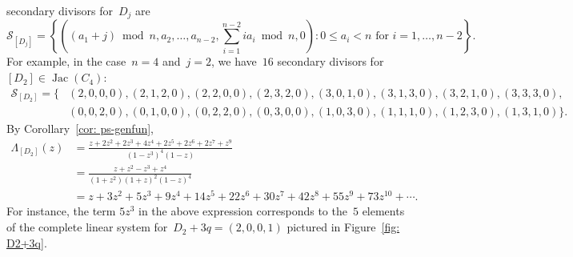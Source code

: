 \documentclass{amsart}
\DeclareMathOperator{\Jac}{Jac}
\newcommand{\secondary}{\mathcal{S}}
\begin{document}
secondary divisors for~$D_j$ are
\[
  \secondary_{[D_j]}=
  \textstyle
  \left\{ \left((a_1+j)\bmod n,a_2,\dots,a_{n-2},\sum_{i=1}^{n-2}ia_i\bmod n,0\right):0\leq
  a_i<n\text{ for~$i=1,\dots,n-2$} \right\}.
\]
For example, in the case~$n=4$ and~$j=2$, we have~$16$ secondary divisors
for~$[D_2]\in\Jac(C_4)$:
\begin{align*}
  \secondary_{[D_2]}= \{ &
    (2, 0, 0, 0), (2, 1, 2, 0), (2, 2, 0, 0), (2, 3, 2, 0), (3, 0, 1, 0), (3, 1, 3, 0),
    (3, 2, 1, 0), (3, 3, 3, 0),
    \\[8pt]
    & (0, 0, 2, 0), (0, 1, 0, 0), (0, 2, 2, 0), (0, 3, 0, 0), (1, 0, 3, 0), (1, 1, 1, 0),
    (1, 2, 3, 0),
  (1, 3, 1, 0) \}.
\end{align*}
By Corollary~\ref{cor: ps-genfun},
\begin{align*}
  \Lambda_{[D_2]}(z)&=\frac{z+2z^2+2z^3+4z^4+2z^5+2z^6+2z^7+z^9}{(1-z^3)^4(1-z)}\\[8pt]
  &=\frac{z+z^2-z^3+z^4}{(1+z^2)(1+z)^2(1-z)^4}\\[8pt]
  &= z+3z^2+5z^3+9z^4+14z^5+22z^6+30z^7+42z^8+55z^9+73z^{10}+\cdots.
\end{align*}
For instance, the term $5z^3$ in the above expression corresponds to the~$5$
elements of the complete linear system for~$D_2+3q=(2,0,0,1)$ pictured in
Figure~\ref{fig: D2+3q}.
\end{document}
